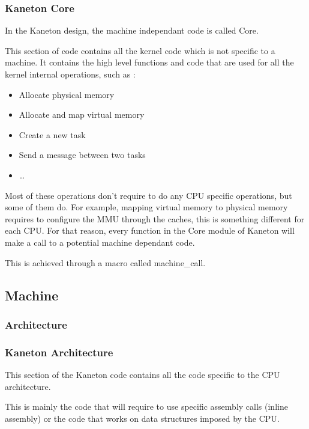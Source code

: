 \begin{frame}
  \frametitle{Kaneton Core}

  In the Kaneton design, the machine independant code is called Core.

  \-

  This section of code contains all the kernel code which is not specific to a machine. It contains the high level functions and code that are used for all the kernel internal operations, such as :
  \begin{itemize}
  \item Allocate physical memory
  \item Allocate and map virtual memory
  \item Create a new task
  \item Send a message between two tasks
  \item \ldots
  \end{itemize}

  Most of these operations don't require to do any CPU specific operations, but some of them do. For example, mapping virtual memory to physical memory requires to configure the MMU through the caches, this is something different for each CPU. For that reason, every function in the Core module of Kaneton will make a call to a potential machine dependant code.

  \-
  
  This is achieved through a macro called machine\_call.

\end{frame}

\subsection{Machine}
\subsubsection{Architecture}

\begin{frame}
  \frametitle{Kaneton Architecture}
  
  This section of the Kaneton code contains all the code specific to the CPU architecture.

  \-

  This is mainly the code that will require to use specific assembly calls (inline assembly) or the code that works on data structures imposed by the CPU.

\end{frame}

